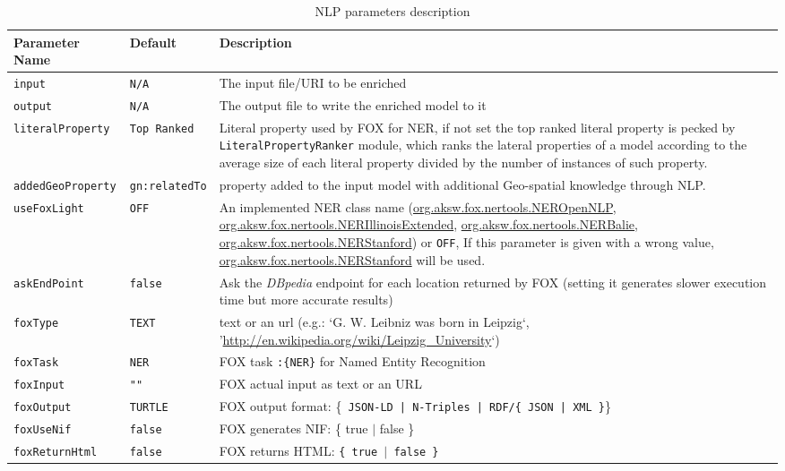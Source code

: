 \documentclass[a4paper,twoside,bibtotoc,abstracton,12pt,BCOR=15mm]{article}
\begin{document}
\begin{table}

\caption{NLP parameters description} \label{tbl:nlpPram}
\small
\begin{tabularx}{\textwidth}{@{}llX@{}}
\toprule
\textbf{Parameter Name} & \textbf{Default} & \textbf{Description}\\
\midrule
\texttt{input} 		& \texttt{N/A} 		& The input file/URI to be enriched\\
\midrule
\texttt{output} 	& \texttt{N/A} 		& The output file to write the enriched model to it\\
\midrule
\texttt{literalProperty}	& \texttt{Top Ranked} 	& Literal property used by FOX for NER, if not set the top ranked literal property is pecked by \texttt{LiteralPropertyRanker} module, which ranks the  lateral properties of a model according to the average size of each literal property divided by the number of instances of such property.\\
\midrule
\texttt{addedGeoProperty}& \texttt{gn:relatedTo\footnotemark[11]}& property added to the input model with additional Geo-spatial knowledge through NLP.\\
\midrule
\texttt{useFoxLight} 	& \texttt{OFF} 	& An implemented NER class name (\url{org.aksw.fox.nertools.NEROpenNLP}, \url{org.aksw.fox.nertools.NERIllinoisExtended}, \url{org.aksw.fox.nertools.NERBalie}, \url{org.aksw.fox.nertools.NERStanford}) or \texttt{OFF}, If this parameter is given with a wrong value, \url{org.aksw.fox.nertools.NERStanford} will be used. \\
\midrule
\texttt{askEndPoint} 	& \texttt{false} 	& Ask the \emph{DBpedia} endpoint for each location returned by FOX (setting it generates slower execution time but more accurate results)\\
\midrule
\texttt{foxType} 	& \texttt{TEXT} 	&  text or an url (e.g.: `G. W. Leibniz was born in Leipzig`, '\url{http://en.wikipedia.org/wiki/Leipzig_University}`) \\
\midrule
\texttt{foxTask} 	& \texttt{NER} 		& FOX task \texttt{:\{NER\}} for Named Entity Recognition\\
\midrule
\texttt{foxInput} 	& \texttt{""} 		& FOX actual input as text or an URL\\
\midrule
\texttt{foxOutput} 	& \texttt{TURTLE} 	& FOX output format: \{\texttt{ JSON-LD | N-Triples | RDF/\{ JSON | XML \}}\}\\
\midrule
\texttt{foxUseNif} 	& \texttt{false} 	& FOX generates NIF: \{ true $\rvert$ false \}\\
\midrule
\texttt{foxReturnHtml} & \texttt{false} 	& FOX returns HTML: \texttt{\{ true $\rvert$ false \}}\\ 
\bottomrule
\end{tabularx}
\end{table}
\end{document}
